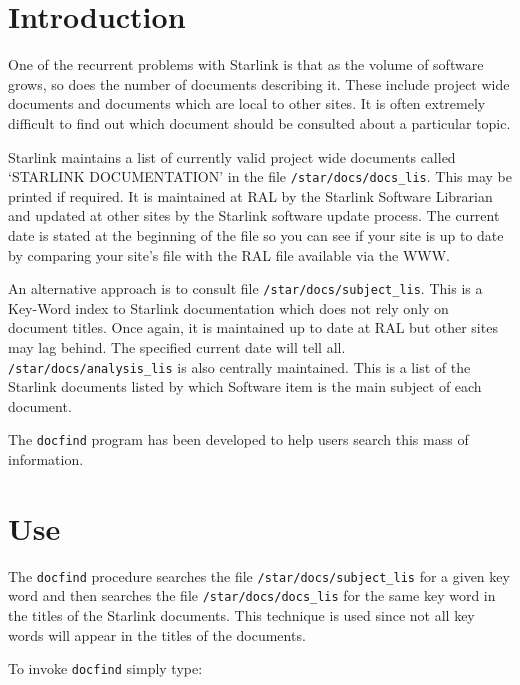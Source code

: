 \documentclass[11pt,nolof]{starlink}
\begin{document}
\scfrontmatter



\section{Introduction}

One of the recurrent problems with Starlink is that as the volume of
software grows, so does the number of documents describing it.  These
include project wide documents and documents which are local to other
sites.  It is often extremely difficult to find out which document
should be consulted about a particular topic.

Starlink maintains a list of currently valid project wide documents
called `STARLINK DOCUMENTATION' in the file {\texttt{/star/docs/docs\_lis}}.
This may be printed if required.  It is maintained at RAL by the
Starlink Software Librarian and updated at other sites by the Starlink
software update process.  The current date is stated at the beginning of
the file so you can see if your site is up to date by comparing your
site's file with the RAL file available via the WWW.

An alternative approach is to consult file {\texttt{/star/docs/subject\_lis}}.
This is a Key-Word index to Starlink documentation which does not rely
only on document titles.  Once again, it is maintained up to date at RAL
but other sites may lag behind.  The specified current date will tell all.
{\texttt{/star/docs/analysis\_lis}} is also centrally maintained.  This is a
list of the Starlink documents listed by which Software item is the main
subject of each document.

The {\texttt{docfind}} program has been developed to help users search this
mass of information.

\section{Use}

The {\texttt{docfind}} procedure searches the file {\texttt{/star/docs/subject\_lis}}
for a given key word and then searches the file {\texttt{/star/docs/docs\_lis}}
for the same key word in the titles of the Starlink documents.  This
technique is used since not all key words will appear in the titles of the
documents.

To invoke {\texttt{docfind}} simply type:
\begin{terminalv}
\end{terminalv}
\end{document}
